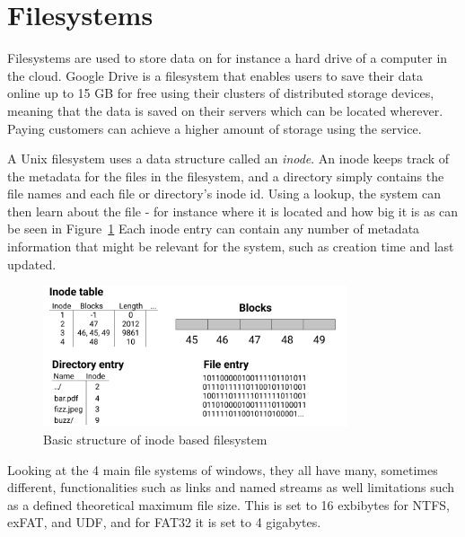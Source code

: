 \section{Filesystems}
Filesystems are used to store data on for instance a hard drive of a computer in the cloud. Google Drive is a filesystem that enables users to save their data online up to 15 GB for free\cite{CloudStorageWork} using their clusters of distributed storage devices, meaning that the data is saved on their servers which can be located wherever\cite{DistributedStorageWhat}. Paying customers can achieve a higher amount of storage using the service.

A Unix filesystem uses a data structure called an \textit{inode}. An inode keeps track of the metadata for the files in the filesystem, and a directory simply contains the file names and each file or directory's inode id. Using a lookup, the system can then learn about the file - for instance where it is located and how big it is as can be seen in Figure~\ref{fig:inode_diag} %
Each inode entry can contain any number of metadata information that might be relevant for the system, such as creation time and last updated.

\begin{figure}[!ht]
	\begin{center}
	  \includegraphics[width=0.8\textwidth]{figures/inode_diagram.png}
	\end{center}
	\caption{Basic structure of inode based filesystem}
	\label{fig:inode_diag}
\end{figure}

Looking at the 4 main file systems of windows, they all have many, sometimes different, functionalities such as links and named streams as well limitations such as a defined theoretical maximum file size\cite{mikbenFileSystemFunctionality}. This is set to 16 exbibytes for NTFS, exFAT, and UDF, and for FAT32 it is set to 4 gigabytes. 

